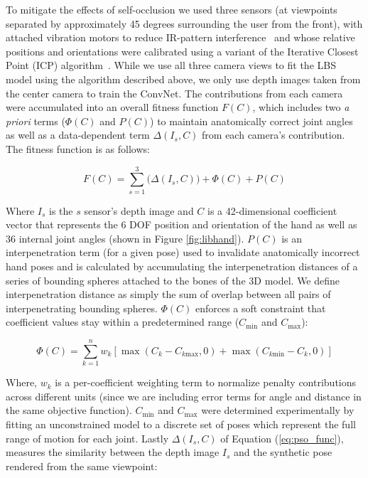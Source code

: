 To mitigate the effects of self-occlusion we used three sensors (at viewpoints separated by approximately 45 degrees surrounding the user from the front), with attached vibration motors to reduce IR-pattern interference~\cite{shake_n_sense} and whose relative positions and orientations were calibrated using a variant of the Iterative Closest Point (ICP) algorithm~\cite{Horn87closed-formsolution}. While we use all three camera views to fit the LBS model using the algorithm described above, we only use depth images taken from the center camera to train the ConvNet. The contributions from each camera were accumulated into an overall fitness function $F\left(C\right)$, which includes two \emph{a priori} terms ($\Phi\left(C\right)$ and $P\left(C\right)$) to maintain anatomically correct joint angles as well as a data-dependent term $\Delta(I_s, C)$ from each camera's contribution. The fitness function is as follows:

\begin{equation}
    F\left(C\right)=\sum_{s=1}^3\bigg(\Delta(I_s, C)\bigg) + \Phi\left(C\right) + P\left(C\right)
    \label{eq:pso_func}
\end{equation}

Where $I_s$ is the $s$ sensor's depth image and $C$ is a 42-dimensional coefficient vector that represents the 6 DOF position and orientation of the hand as well as 36 internal joint angles (shown in Figure \ref{fig:libhand}). $P\left(C\right)$ is an interpenetration term (for a given pose) used to invalidate anatomically incorrect hand poses and is calculated by accumulating the interpenetration distances of a series of bounding spheres attached to the bones of the 3D model. We define interpenetration distance as simply the sum of overlap between all pairs of interpenetrating bounding spheres. $\Phi\left(C\right)$ enforces a soft constraint that coefficient values stay within a predetermined range ($C_{\text{min}}$ and $C_{\text{max}}$):

\begin{equation*}
    \Phi\left(C\right) = \sum\limits_{k=1}^n w_k\left[\operatorname{max}\left(C_k-C_{k\text{max}}, 0\right) + \operatorname{max}\left(C_{k\text{min}}-C_k, 0\right)\right]
    \label{eq:pso_penalty}
\end{equation*}

Where, $w_k$ is a per-coefficient weighting term to normalize penalty contributions across different units (since we are including error terms for angle and distance in the same objective function). $C_{\text{min}}$ and $C_{\text{max}}$ were determined experimentally by fitting an unconstrained model to a discrete set of poses which represent the full range of motion for each joint. Lastly $\Delta(I_s, C)$ of Equation (\ref{eq:pso_func}), measures the similarity between the depth image $I_s$ and the synthetic pose rendered from the same viewpoint:

